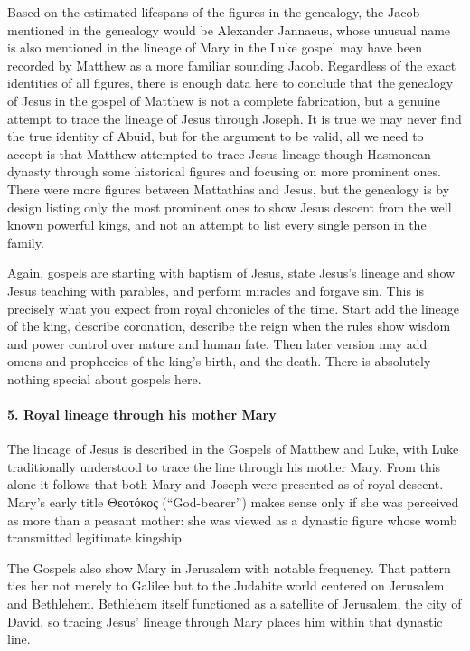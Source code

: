 Based on the estimated lifespans of the figures in the genealogy, the Jacob mentioned in the genealogy would be Alexander Jannaeus, whose unusual name is also mentioned in the lineage of Mary in the Luke gospel may have been recorded by Matthew as a more familiar sounding Jacob.
Regardless of the exact identities of all figures, there is enough data here to conclude that the genealogy of Jesus in the gospel of Matthew is not a complete fabrication, but a genuine attempt to trace the lineage of Jesus through Joseph.
It is true we may never find the true identity of Abuid, but for the argument to be valid, all we need to accept is that Matthew attempted to trace Jesus lineage though Hasmonean dynasty through some historical figures and focusing on more prominent ones.
There were more figures between Mattathias and Jesus, but the genealogy is by design listing only the most prominent ones to show Jesus descent from the well known powerful kings, and not an attempt to list every single person in the family.

Again, gospels are starting with baptism of Jesus, state Jesus's lineage and show Jesus teaching with parables, and perform miracles and forgave sin.
This is precisely what you expect from royal chronicles of the time.
Start add the lineage of the king, describe coronation, describe the reign when the rules show wisdom and power control over nature and human fate.
Then later version may add omens and prophecies of the king's birth, and the death.
There is absolutely nothing special about gospels here.

\paragraph{5.
Royal lineage through his mother Mary}\label{par:royal-lineage-through-his-mother-mary}

The lineage of Jesus is described in the Gospels of Matthew and Luke, with Luke traditionally understood to trace the line through his mother Mary.
From this alone it follows that both Mary and Joseph were presented as of royal descent.
Mary’s early title Θεοτόκος (“God-bearer”) makes sense only if she was perceived as more than a peasant mother: she was viewed as a dynastic figure whose womb transmitted legitimate kingship.

The Gospels also show Mary in Jerusalem with notable frequency.
That pattern ties her not merely to Galilee but to the Judahite world centered on Jerusalem and Bethlehem.
Bethlehem itself functioned as a satellite of Jerusalem, the city of David, so tracing Jesus’ lineage through Mary places him within that dynastic line.

